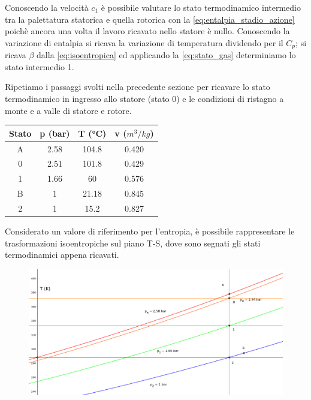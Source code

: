 \documentclass[a4paper,12pt]{article}
\begin{document}
Conoscendo la velocità $c_1$ è possibile valutare lo stato termodinamico intermedio tra la palettatura statorica e quella rotorica con la \eqref{eq:entalpia_stadio_azione}
poichè ancora una volta il lavoro ricavato nello statore è nullo.
Conoscendo la variazione di entalpia si ricava la variazione di temperatura dividendo per il $C_p$; si ricava $\beta$ dalla \eqref{eq:isoentropica}
ed applicando la \eqref{eq:stato_gas} determiniamo lo stato intermedio 1.

Ripetiamo i passaggi svolti nella precedente sezione per ricavare lo stato termodinamico in ingresso allo statore (stato 0) e le
condizioni di ristagno a monte e a valle di statore e rotore.
\begin{center}
    \begin{tabular}{c|c|c|c}
        Stato   &p (bar)    &T (°C) &v ($m^3/kg$) \\ \hline
        A       &2.58       &104.8  &0.420  \\
        0       &2.51       &101.8  &0.429  \\
        1       &1.66       &60     &0.576  \\
        B       &1          &21.18  &0.845  \\
        2       &1          &15.2   &0.827  
    \end{tabular}
\end{center}

Considerato un valore di riferimento per l'entropia, è possibile rappresentare le trasformazioni isoentropiche sul piano T-S, dove sono segnati gli stati termodinamici
appena ricavati.
\begin{figure}[H]
    \label{fig:trasformazioni_TS_reazione}
    \centering
    \includegraphics[width=.99\linewidth]{media/trasformazioni_TS_reazione.png}
\end{figure}
\end{document}
